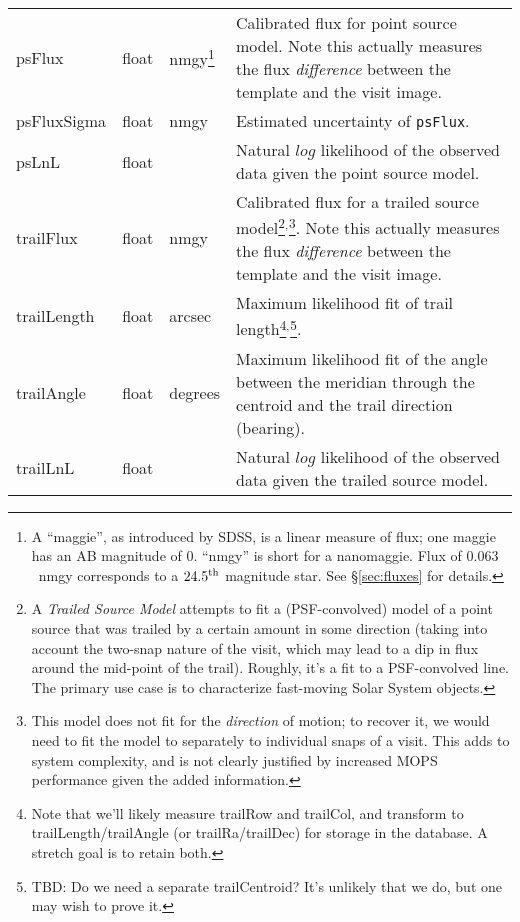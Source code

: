 \documentclass[12pt]{article}
\begin{document}
\begin{center}
\begin{longtable}{p{3cm}p{2cm}p{2cm}p{5cm}}
psFlux & float & nmgy\footnote{A ``maggie'', as introduced by SDSS, is a
linear measure of flux; one maggie has an AB magnitude of 0. ``nmgy'' is short
for a nanomaggie. Flux of $0.063$~nmgy corresponds to a $24.5^{\rm th}$
magnitude star. See \S \ref{sec:fluxes} for details.} & Calibrated flux for
point source model. Note this actually measures the flux {\em difference}
between the template and the visit image. \\ 

psFluxSigma & float & nmgy & Estimated uncertainty of \texttt{psFlux}. \\

psLnL & float & ~ & Natural $log$ likelihood of the observed data given the
point source model. \\ 

trailFlux & float & nmgy & Calibrated flux for a trailed source
model\footnote{A {\em Trailed Source Model} attempts to fit a (PSF-convolved)
model of a point source that was trailed by a certain amount in some direction
(taking into account the two-snap nature of the visit, which may lead to a dip
in flux around the mid-point of the trail). Roughly, it's a fit to a
PSF-convolved line. The primary use case is to characterize fast-moving Solar
System objects.}$^,$\footnote{This model does not fit for the {\em direction}
of motion; to recover it, we would need to fit the model to separately to
individual snaps of a visit. This adds to system complexity, and is not
clearly justified by increased MOPS performance given the added information.}.
Note this actually measures the flux {\em difference} between the template and
the visit image. \\ 

trailLength & float & arcsec & Maximum likelihood fit of trail
length\footnote{Note that we'll likely measure trailRow and trailCol, and
transform to trailLength/trailAngle (or trailRa/trailDec) for storage in the
database. A stretch goal is to retain both.}$^,$\footnote{TBD: Do we need a
separate trailCentroid? It's unlikely that we do, but one may wish to prove
it.}. \\ 

trailAngle & float & degrees & Maximum likelihood fit of the angle between the
meridian through the centroid and the trail direction (bearing). \\ 

trailLnL & float & ~ & Natural $log$ likelihood of the observed data given the
trailed source model. \\ 


\end{longtable}
\end{center}
\end{document}

